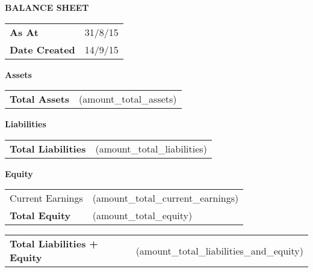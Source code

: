 \documentclass[english]{article}
\providecommand{\tabularnewline}{\\}
\begin{document}

\noindent \vspace{10mm}



\noindent \textbf{BALANCE SHEET}

\noindent \vspace{10mm}


\noindent \begin{tabular}{ll}
\textbf{As At} & 31/8/15
\tabularnewline
\textbf{Date Created} & 14/9/15 \tabularnewline
\end{tabular}

\noindent \vspace{10mm}

\noindent \textbf{Assets}

\noindent \begin{tabular}{>{\raggedright}p{}>{\raggedright}p{}}
\cline{2-2} 
\textbf{Total Assets} & (amount\_total\_assets)\tabularnewline
\end{tabular}

\noindent \vspace{5mm}


\noindent \textbf{Liabilities}

\noindent \begin{tabular}{>{\raggedright}p{}>{\raggedright}p{}}
\cline{2-2} 
\textbf{Total Liabilities} & (amount\_total\_liabilities)\tabularnewline
\end{tabular}

\noindent \vspace{5mm}


\noindent \textbf{Equity}

\noindent \begin{tabular}{>{\raggedright}p{}>{\raggedright}p{}}
Current Earnings & (amount\_total\_current\_earnings)\tabularnewline
\cline{2-2} 
\textbf{Total Equity} & (amount\_total\_equity)\tabularnewline
\end{tabular}

\noindent \vspace{5mm}


\noindent \begin{tabular}{>{\raggedright}p{}>{\raggedright}p{}}
\textbf{Total Liabilities + Equity} & (amount\_total\_liabilities\_and\_equity)\tabularnewline
\end{tabular}
\end{document}
